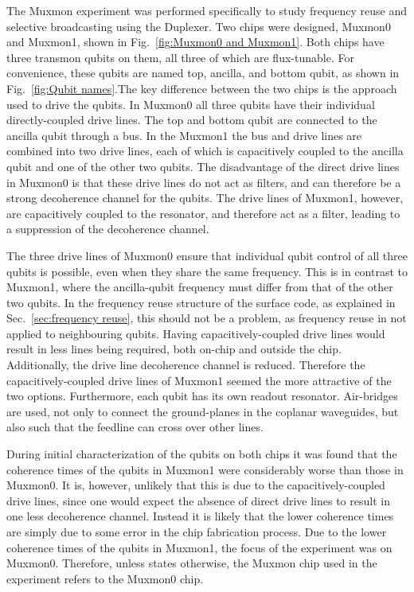       The Muxmon experiment was performed specifically to study frequency reuse and selective broadcasting using the Duplexer. Two chips were designed, Muxmon0 and Muxmon1, shown in Fig.~\ref{fig:Muxmon0 and Muxmon1}. Both chips have three transmon qubits on them, all three of which are flux-tunable. For convenience, these qubits are named top, ancilla, and bottom qubit, as shown in Fig.~\ref{fig:Qubit names}.The key difference between the two chips is the approach used to drive the qubits. In Muxmon0 all three qubits have their individual directly-coupled drive lines. The top and bottom qubit are connected to the ancilla qubit through a bus. In the Muxmon1 the bus and drive lines are combined into two drive lines, each of which is capacitively coupled to the ancilla qubit and one of the other two qubits. The disadvantage of the direct drive lines in Muxmon0 is that these drive lines do not act as filters, and can therefore be a strong decoherence channel for the qubits. The drive lines of Muxmon1, however, are capacitively coupled to the resonator, and therefore act as a filter, leading to a suppression of the decoherence channel.

      The three drive lines of Muxmon0 ensure that individual qubit control of all three qubits is possible, even when they share the same frequency. This is in contrast to Muxmon1, where the ancilla-qubit frequency must differ from that of the other two qubits. In the frequency reuse structure of the surface code, as explained in Sec.~\ref{sec:frequency reuse}, this should not be a problem, as frequency reuse in not applied to neighbouring qubits. Having capacitively-coupled drive lines would result in less lines being required, both on-chip and outside the chip. Additionally, the drive line decoherence channel is reduced. Therefore the capacitively-coupled drive lines of Muxmon1 seemed the more attractive of the two options. Furthermore, each qubit has its own readout resonator. Air-bridges are used, not only to connect the ground-planes in the coplanar waveguides, but also such that the feedline can cross over other lines.

      During initial characterization of the qubits on both chips it was found that the coherence times of the qubits in Muxmon1 were considerably worse than those in Muxmon0. It is, however, unlikely that this is due to the capacitively-coupled drive lines, since one would expect the absence of direct drive lines to result in one less decoherence channel. Instead it is likely that the lower coherence times are simply due to some error in the chip fabrication process. Due to the lower coherence times of the qubits in Muxmon1, the focus of the experiment was on Muxmon0. Therefore, unless states otherwise, the Muxmon chip used in the experiment refers to the Muxmon0 chip.


